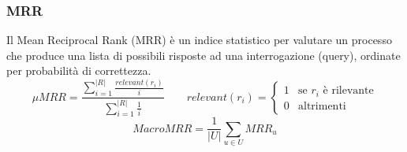 \documentclass{beamer}
\begin{document}

\begin{frame}
	\frametitle{MRR}
	Il Mean Reciprocal Rank (MRR) è un indice statistico per valutare un processo che produce una lista di possibili risposte ad una interrogazione (query), ordinate per probabilità di correttezza.
		\begin{equation*}
			\mu MRR =\frac{\sum\limits_{i=1}^{|R|}{\frac{relevant(r_i)}{i}}}{\sum\limits_{i=1}^{|R|}{\frac{1}{i}}} \qquad relevant(r_i)=\begin{cases} 1 & \mbox{se }r_i\mbox{ è rilevante} \\ 0 & \mbox{altrimenti}
			\end{cases}
		\end{equation*}
		$$ MacroMRR =\frac{1}{|U|}\sum_{u\in U}{MRR_u} $$
\end{frame}
\end{document}
